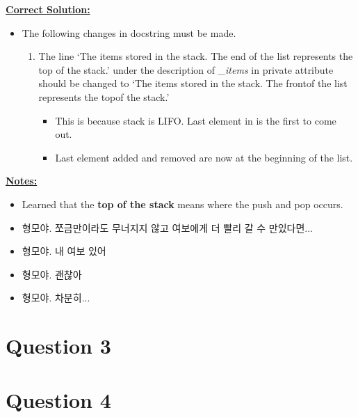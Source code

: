 \documentclass[12pt]{article}
\begin{document}
\begin{mdframed}
    \underline{\textbf{Correct Solution:}}

    \bigskip

    \begin{itemize}
        \item

        The following changes in docstring must be made.

        \begin{enumerate}[1.]
            \item The line `The items stored in the stack. The end of the list represents the top of the stack.'
            under the description of \textit{\_items} in private attribute should be changed to
            `The items stored in the stack. The \color{red}front\color{black}\:of the list represents the \color{red}top\color{black}\:of the stack.'
            \color{red}
                \begin{itemize}
                    \item This is because stack is LIFO. Last element in is the first to come out.
                    \item Last element added and removed are now at the beginning of the list.
                \end{itemize}
            \color{black}
        \end{enumerate}
    \end{itemize}

\end{mdframed}

\bigskip

\underline{\textbf{Notes:}}

\bigskip

\begin{itemize}
    \item Learned that the \textbf{top of the stack} means where the push and pop occurs.
    \item 형모야. 쪼금만이라도 무너지지 않고 여보에게 더 빨리 갈 수 만있다면...
    \item 형모야. 내 여보 있어
    \item 형모야. 괜찮아
    \item 형모야. 차분히...
\end{itemize}

\section*{Question 3}

\section*{Question 4}
\end{document}
